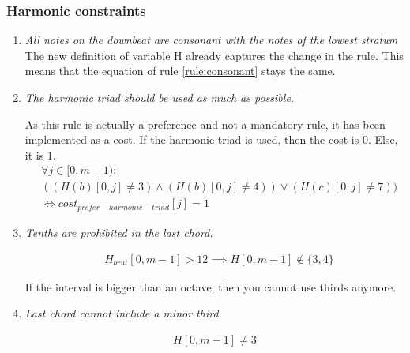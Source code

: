 \subsubsection{Harmonic constraints}
\begin{enumerate}[wide, label=\bfseries 1.H\arabic*]        
    \item\label{constraint:consonant} \textit{All notes on the downbeat are consonant with the notes of the lowest stratum}
    The new definition of variable H already captures the change in the rule. This means that the equation of rule \ref{rule:consonant} stays the same.

   \setcounter{enumi}{7} 

    \item\label{constraint:harmonic-triad} \reddot \textit{The harmonic triad should be used as much as possible.}
    
    As this rule is actually a preference and not a mandatory rule, it has been implemented as a cost. If the harmonic triad is used, then the cost is 0. Else, it is 1.
    \begin{equation}
    \begin{aligned}
    &\forall j \in [0, m-1) \colon \\
    &((H(b)[0, j] \neq 3) \land (H(b)[0, j] \neq 4)) \lor (H(c)[0, j]  \neq 7)) \\
    &\iff cost_{prefer-harmonic-triad}[j] = 1
    \end{aligned}
    \end{equation}
    
    \addtocounter{enumi}{1} 


    \item\label{constraint:tenth-is-last-chord} \reddot \textit{Tenths are prohibited in the last chord.}

    \begin{equation} \begin{aligned}
    &H_{brut}[0, m-1] > 12 \implies H[0, m-1] \notin \{3, 4\}
    \end{aligned} \end{equation}

    If the interval is bigger than an octave, then you cannot use thirds anymore.

    \addtocounter{enumi}{1} 

    \item\label{constraint:minor-third} \reddot \textit{Last chord cannot include a minor third.}

    \begin{equation} \begin{aligned}
    H[0, m-1] \neq 3
    \end{aligned} \end{equation}
\end{enumerate}

